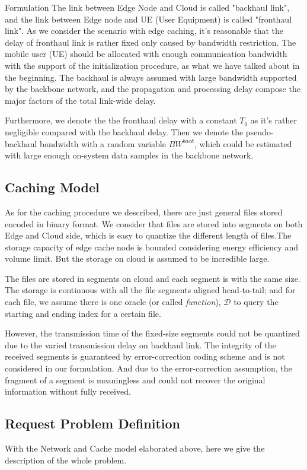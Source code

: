 \documentclass{article}
\begin{document}
\begin{section}{Formulation}
    The link between Edge Node and Cloud is called "backhaul link", and the link between Edge node and UE (User Equipment) is called "fronthaul link".
    As we consider the scenario with edge caching, it's reasonable that the delay of fronthaul link is rather fixed only caused by bandwidth restriction. The mobile user (UE) should be allocated with enough communication bandwidth with the support of the initialization procedure, as what we have talked about in the beginning. The backhaul is always assumed with large bandwidth supported by the backbone network, and the propagation and processing delay compose the major factors of the total link-wide delay.

    Furthermore, we denote the the fronthaul delay with a constant $T_0$ as it's rather negligible compared with the backhaul delay. Then we denote the pseudo-backhaul bandwidth with a random variable $BW^{back}$, which could be estimated with large enough on-system data samples in the backbone network.
    
    \subsection{Caching Model}
    As for the caching procedure we described, there are just general files stored encoded in binary format. We consider that files are stored into segments on both Edge and Cloud side, which is easy to quantize the different length of files.The storage capacity of edge cache node is bounded considering energy efficiency and volume limit. But the storage on cloud is assumed to be incredible large.
    
    The files are stored in segments on cloud and each segment is with the same size. The storage is continuous with all the file segments aligned head-to-tail; and for each file, we assume there is one oracle (or called \textit{function}), $\mathcal{D}$ to query the starting and ending index for a certain file.

    However, the transmission time of the fixed-size segments could not be quantized due to the varied transmission delay on backhaul link. The integrity of the received segments is guaranteed by error-correction coding scheme and is not considered in our formulation. And due to the error-correction assumption, the fragment of a segment is meaningless and could not recover the original information without fully received.

    \subsection{Request Problem Definition}
    With the Network and Cache model elaborated above, here we give the description of the whole problem.


\end{section}
\end{document}
